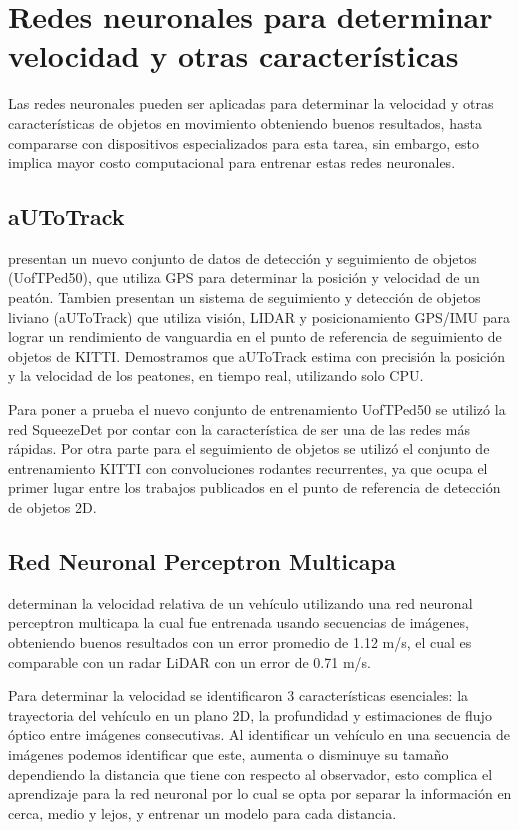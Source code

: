 \section{Redes neuronales para determinar velocidad y otras características}

Las redes neuronales pueden ser aplicadas para determinar la velocidad y otras características de objetos en movimiento obteniendo buenos resultados, hasta compararse con dispositivos especializados para esta tarea, sin embargo, esto implica mayor costo computacional para entrenar estas redes neuronales.

\subsection{aUToTrack}

\citeauthor{burnett2020aUToTrack} presentan un nuevo conjunto de datos de detección y seguimiento de objetos (UofTPed50), que utiliza GPS para determinar la posición y velocidad de un peatón. Tambien presentan un sistema de seguimiento y detección de objetos liviano (aUToTrack) que utiliza visión, LIDAR y posicionamiento GPS/IMU para lograr un rendimiento de vanguardia en el punto de referencia de seguimiento de objetos de KITTI. Demostramos que aUToTrack estima con precisión la posición y la velocidad de los peatones, en tiempo real, utilizando solo CPU.

Para poner a prueba el nuevo conjunto de entrenamiento UofTPed50 se utilizó la red SqueezeDet por contar con la característica de ser una de las redes más rápidas. Por otra parte para el seguimiento de objetos se utilizó el conjunto de entrenamiento KITTI con convoluciones rodantes recurrentes, ya que ocupa el primer lugar entre los trabajos publicados en el punto de referencia de detección de objetos 2D.

\subsection{Red Neuronal Perceptron Multicapa}

\citeauthor{kampelmuhler2018Camera} determinan la velocidad relativa de un vehículo utilizando una red neuronal perceptron multicapa la cual fue entrenada usando secuencias de imágenes, obteniendo buenos resultados con un error promedio de 1.12 m/s, el cual es comparable con un radar  LiDAR con un error de 0.71 m/s.

Para determinar la velocidad se identificaron 3 características esenciales: la trayectoria del vehículo en un plano 2D, la profundidad y estimaciones de flujo óptico entre imágenes consecutivas. Al identificar un vehículo en una secuencia de imágenes podemos identificar que este, aumenta o disminuye su tamaño dependiendo la distancia que tiene con respecto al observador, esto complica el aprendizaje para la red neuronal por lo cual se opta por separar la información en cerca, medio y lejos, y entrenar un modelo para cada distancia.

